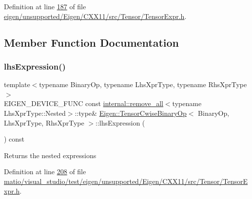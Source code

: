 Definition at line \hyperlink{eigen_2unsupported_2_eigen_2_c_x_x11_2src_2_tensor_2_tensor_expr_8h_source_l00187}{187} of file \hyperlink{eigen_2unsupported_2_eigen_2_c_x_x11_2src_2_tensor_2_tensor_expr_8h_source}{eigen/unsupported/\+Eigen/\+C\+X\+X11/src/\+Tensor/\+Tensor\+Expr.\+h}.



\subsection{Member Function Documentation}
\mbox{\label{class_eigen_1_1_tensor_cwise_binary_op_abe293a3a1ee663b55c0363d2fb751397}} 
\subsubsection{\texorpdfstring{lhs\+Expression()}{lhsExpression()}\hspace{0.1cm}{\footnotesize\ttfamily [1/2]}}
{\footnotesize\ttfamily template$<$typename Binary\+Op, typename Lhs\+Xpr\+Type, typename Rhs\+Xpr\+Type$>$ \\
E\+I\+G\+E\+N\+\_\+\+D\+E\+V\+I\+C\+E\+\_\+\+F\+U\+NC const \hyperlink{struct_eigen_1_1internal_1_1remove__all}{internal\+::remove\+\_\+all}$<$typename Lhs\+Xpr\+Type\+::\+Nested$>$\+::type\& \hyperlink{class_eigen_1_1_tensor_cwise_binary_op}{Eigen\+::\+Tensor\+Cwise\+Binary\+Op}$<$ Binary\+Op, Lhs\+Xpr\+Type, Rhs\+Xpr\+Type $>$\+::lhs\+Expression (\begin{DoxyParamCaption}{ }\end{DoxyParamCaption}) const\hspace{0.3cm}{\ttfamily [inline]}}

\begin{DoxyReturn}{Returns}
the nested expressions 
\end{DoxyReturn}


Definition at line \hyperlink{matio_2visual__studio_2test_2eigen_2unsupported_2_eigen_2_c_x_x11_2src_2_tensor_2_tensor_expr_8h_source_l00208}{208} of file \hyperlink{matio_2visual__studio_2test_2eigen_2unsupported_2_eigen_2_c_x_x11_2src_2_tensor_2_tensor_expr_8h_source}{matio/visual\+\_\+studio/test/eigen/unsupported/\+Eigen/\+C\+X\+X11/src/\+Tensor/\+Tensor\+Expr.\+h}.

